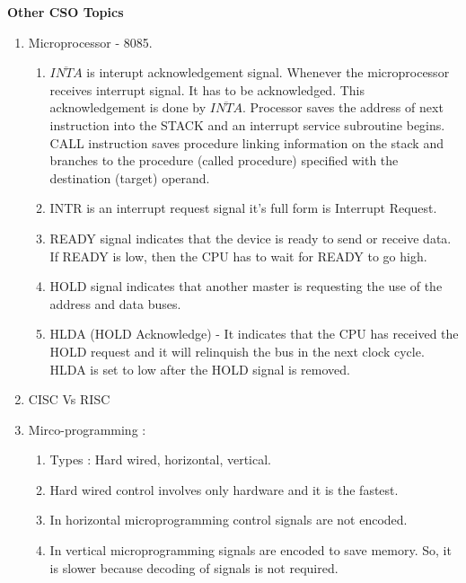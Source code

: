 
\centerline{\textbf{ \LARGE Other CSO Topics}}

\begin{enumerate}
    \item Microprocessor - 8085.
    \begin{enumerate}
        \item \( \overline{INTA} \)  is interupt acknowledgement signal. Whenever the microprocessor
              receives interrupt signal. It has to be acknowledged. This acknowledgement is done by
              \( \overline{INTA} \).  Processor saves the address of next instruction into the STACK
              and an interrupt service subroutine begins. CALL instruction saves procedure linking
              information on the stack and branches to the procedure (called procedure) specified
              with the destination (target) operand.

        \item INTR is an interrupt request signal it's full form is Interrupt Request.

        \item READY signal indicates that the device is ready to send or receive data.
              If READY is low, then the CPU has to wait for READY to go high.

        \item HOLD signal indicates that another master is requesting the use of the address and data buses.

        \item HLDA (HOLD Acknowledge) - It indicates that the CPU has received the HOLD request and it will
              relinquish the bus in the next clock cycle. HLDA is set to low after the HOLD signal is removed.

    \end{enumerate}

    \item CISC Vs RISC

    \item Mirco-programming :
    \begin{enumerate}
      \item Types : Hard wired, horizontal, vertical.
      \item Hard wired control involves only hardware and it is the fastest.
      \item In horizontal microprogramming control signals are not encoded.
      \item In vertical microprogramming signals are encoded to save memory. So, it is slower because
            decoding of signals is not required.
    \end{enumerate}
\end{enumerate}
